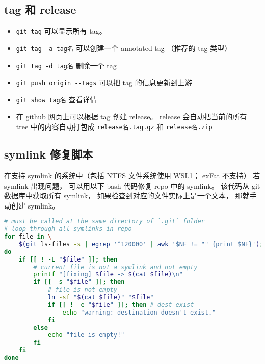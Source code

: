 \subsection{tag 和 release}
\begin{itemize}
\item \verb`git tag` 可以显示所有 tag。
\item \verb`git tag -a tag名` 可以创建一个 annotated tag （推荐的 tag 类型）
\item \verb`git tag -d tag名` 删除一个 tag
\item \verb`git push origin --tags` 可以把 tag 的信息更新到上游
\item \verb`git show tag名` 查看详情
\item 在 github 网页上可以根据 tag 创建 release。 release 会自动把当前的所有 tree 中的内容自动打包成 \verb`release名.tag.gz` 和 \verb`release名.zip`
\end{itemize}

\subsection{symlink 修复脚本}

在支持 symlink 的系统中（包括 NTFS 文件系统使用 WSL1； exFat 不支持） 若 symlink 出现问题， 可以用以下 bash 代码修复 repo 中的 symlink。 该代码从 git 数据库中获取所有 symlink， 如果检查到对应的文件实际上是一个文本， 那就手动创建 symlink。

\begin{lstlisting}[language=bash, caption=fix\_git\_symlink.sh]
# must be called at the same directory of `.git` folder
# loop through all symlinks in repo
for file in \
	$(git ls-files -s | egrep '^120000' | awk '$NF != "" {print $NF}');
do
	if [[ ! -L "$file" ]]; then
		# current file is not a symlink and not empty
		printf "[fixing] $file -> $(cat $file)\n"
		if [[ -s "$file" ]]; then
			# file is not empty
			ln -sf "$(cat $file)" "$file"
			if [[ ! -e "$file" ]]; then # dest exist
				echo "warning: destination doesn't exist."
			fi
		else
			echo "file is empty!"
		fi
	fi
done
\end{lstlisting}

